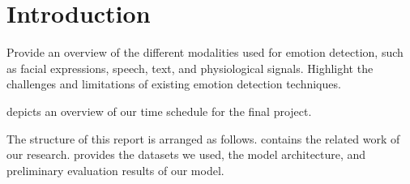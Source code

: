 \section{Introduction}
\label{sec:intro}


Provide an overview of the different modalities used for emotion detection, such as facial expressions, speech, text, and physiological signals.
Highlight the challenges and limitations of existing emotion detection techniques.

 depicts an overview of our time schedule for the final project. 

The structure of this report is arranged as follows. 
 contains the related work of our research. 
 provides the datasets we used, 
the model architecture, 
and preliminary evaluation results of our model. 






